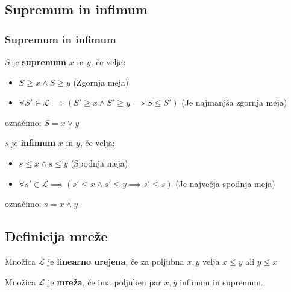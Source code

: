 \documentclass{beamer}
\begin{document}
\begin{frame}
\subsection{Supremum in infimum}
\frametitle{Supremum in infimum}

\begin{definition}
$S$ je \textbf{supremum} $x$ in $y$, če velja: 
\begin{itemize}
\item $S \geq x \land S \geq y$ (Zgornja meja)
\item $\forall S' \in \mathcal{L} \implies (S' \geq x \land S' \geq y \implies S \leq S')$ (Je najmanjša zgornja meja)
\end{itemize}
označimo: $S = x \lor y$ 
\end{definition}

\pause
\begin{definition}
$s$ je \textbf{infimum} $x$ in $y$, če velja: 
\begin{itemize}
\item $s \leq x \land s \leq y$ (Spodnja meja)
\item $\forall s' \in \mathcal{L} \implies (s' \leq x \land s' \leq y \implies s' \leq s)$ (Je največja spodnja meja)
\end{itemize}
označimo: $s = x \land y$ 
\end{definition}

\end{frame}

\begin{frame}
\subsection{Definicija mreže}
\begin{definition}
Množica $\mathcal{L}$ je \textbf{linearno urejena}, če za poljubna $x,y$ velja $x \leq y$ ali  $y \leq x$ 
\end{definition}
\pause
\begin{definition}
Množica $\mathcal{L}$ je \textbf{mreža}, če ima poljuben par $x,y$ infimum in supremum.
\end{definition}

\end{frame}
\end{document}
